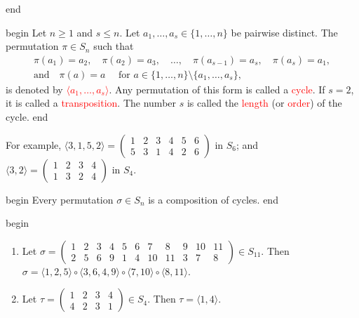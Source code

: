 \documentclass[
  12pt,
  a4paper,
  twoside]{article}
\theoremstyle{plain}
\theoremstyle{definition}
\begin{document}
\csname end

\csname begin\label{cnj:defn-cycle-notation}
Let \(n\geq 1\) and \(s\leq n\). Let \(a_1, \dots, a_s\in\{1,\dots,n\}\) be pairwise distinct. The permutation \(\pi\in S_n\) such that
\begin{gather*}
\pi(a_1)=a_2,\quad \pi(a_2)=a_3,\quad \dots,\quad \pi(a_{s-1})=a_s,\quad \pi(a_s) = a_1,\\
\text{and}\quad \pi(a) = a \quad\text{ for }a\in\{1,\dots,n\}\setminus\{a_1,\dots,a_s\},
\end{gather*}
is denoted by \textcolor{red}{$\langle a_1,\dots,a_s\rangle$}. Any permutation of this form is called a \textcolor{red}{cycle}.
If \(s=2\), it is called a \textcolor{red}{transposition}. The number \(s\) is called the \textcolor{red}{length} (or \textcolor{red}{order}) of the cycle.
\csname end

For example, \(\langle 3,1,5,2\rangle=\begin{pmatrix}1&2&3&4&5&6\\5&3&1&4&2&6\end{pmatrix}\) in \(S_6\); and \(\langle 3,2\rangle = \begin{pmatrix}1&2&3&4\\1&3&2&4\end{pmatrix}\) in \(S_4\).

\csname begin\label{cnj:prop-perms-are-comps-of-cycles}
Every permutation \(\sigma\in S_n\) is a composition of cycles.
\csname end

\csname begin\label{cnj:exam-perm-into-cycles}

\begin{enumerate}
\def\labelenumi{(\alph{enumi})}
\item
  Let \(\sigma=\left(\begin{array}{ccccccccccc}1&2&3&4&5&6&7&8&9&10&11\\ 2&5&6&9&1&4&10&11&3&7&8\end{array}\right)\in S_{11}\). Then
  \(\sigma = \langle 1,2,5\rangle\circ \langle 3,6,4,9\rangle \circ \langle 7,10\rangle\circ\langle 8,11\rangle\).
\item
  Let \(\tau=\begin{pmatrix}1&2&3&4\\ 4&2&3&1\end{pmatrix}\in S_4\). Then \(\tau=\langle 1,4\rangle\).
\end{enumerate}
\end{document}
